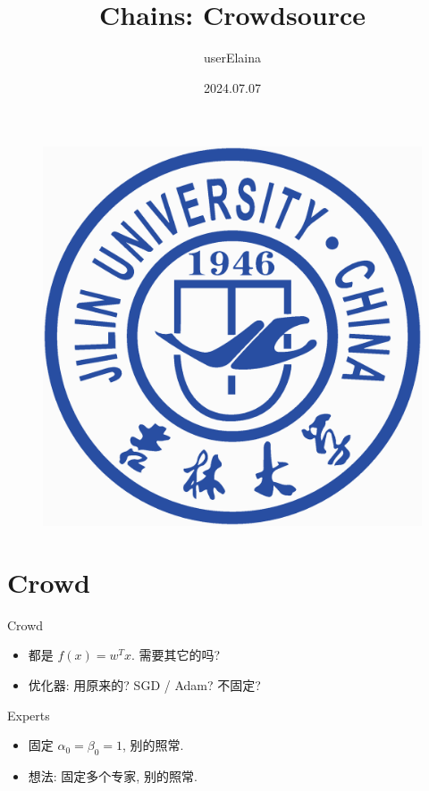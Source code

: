 \documentclass{beamer}
\author{userElaina}
\title{Chains: Crowdsource}
\institute{School of AI}
\date{2024.07.07}
\begin{document}
\kaishu
\begin{frame}
    \titlepage
    \begin{figure}[htpb]
        \begin{center}
            \includegraphics[width=0.15\linewidth]{pic/Jilin_University_Logo.eps}
        \end{center}
    \end{figure}
\end{frame}


\section{Crowd}


\begin{frame}{Crowd}
    \begin{itemize}
        \item 都是 $f(x) = w^Tx$. 需要其它的吗?
        \item 优化器: 用原来的? SGD / Adam? 不固定?
    \end{itemize}
\end{frame}

\begin{frame}{Experts}
    \begin{itemize}
        \item 固定 $\alpha_0=\beta_0=1$, 别的照常.
        \item 想法: 固定多个专家, 别的照常.
    \end{itemize}
\end{frame}
\end{document}

